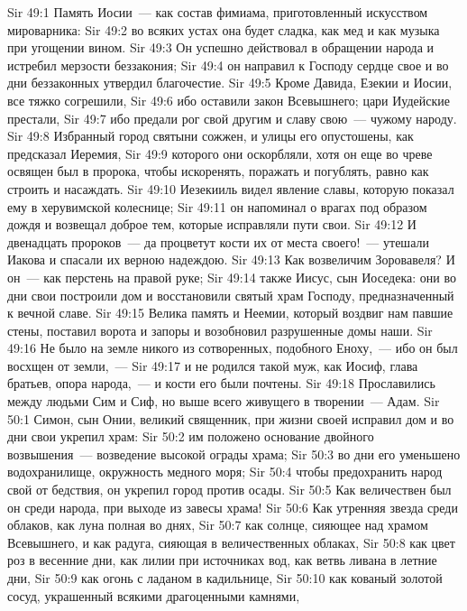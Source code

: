 \vs Sir 49:1 Память Иосии~--- как состав фимиама, приготовленный искусством мироварника:
\vs Sir 49:2 во всяких устах она будет сладка, как мед и как музыка при угощении вином.
\vs Sir 49:3 Он успешно действовал в обращении народа и истребил мерзости беззакония;
\vs Sir 49:4 он направил к Господу сердце свое и во дни беззаконных утвердил благочестие.
\vs Sir 49:5 Кроме Давида, Езекии и Иосии, все тяжко согрешили,
\vs Sir 49:6 ибо оставили закон Всевышнего; цари Иудейские престали,
\vs Sir 49:7 ибо предали рог свой другим и славу свою~--- чужому народу.
\vs Sir 49:8 Избранный город святыни сожжен, и улицы его опустошены, как предсказал Иеремия,
\vs Sir 49:9 которого они оскорбляли, хотя он еще во чреве освящен был в пророка, чтобы искоренять, поражать и погублять, равно как строить и насаждать.
\rsbpar\vs Sir 49:10 Иезекииль видел явление славы, которую  показал ему в херувимской колеснице;
\vs Sir 49:11 он напоминал о врагах под образом дождя и возвещал доброе тем, которые исправляли пути свои.
\vs Sir 49:12 И двенадцать пророков~--- да процветут кости их от места своего!~--- утешали Иакова и спасали их верною надеждою.
\vs Sir 49:13 Как возвеличим Зоровавеля? И он~--- как перстень на правой руке;
\vs Sir 49:14 также Иисус, сын Иоседека: они во дни свои построили дом и восстановили святый храм Господу, предназначенный к вечной славе.
\vs Sir 49:15 Велика память и Неемии, который воздвиг нам павшие стены, поставил ворота и запоры и возобновил разрушенные домы наши.
\vs Sir 49:16 Не было на земле никого из сотворенных, подобного Еноху,~--- ибо он был восхщен от земли,~---
\vs Sir 49:17 и не родился такой муж, как Иосиф, глава братьев, опора народа,~--- и кости его были почтены.
\vs Sir 49:18 Прославились между людьми Сим и Сиф, но выше всего живущего в творении~--- Адам.
\vs Sir 50:1 Симон, сын Онии, великий священник, при жизни своей исправил дом и во дни свои укрепил храм:
\vs Sir 50:2 им положено основание двойного возвышения~--- возведение высокой ограды храма;
\vs Sir 50:3 во дни его уменьшено водохранилище, окружность медного моря;
\vs Sir 50:4 чтобы предохранить народ свой от бедствия, он укрепил город против осады.
\vs Sir 50:5 Как величествен был он среди народа, при выходе из завесы храма!
\vs Sir 50:6 Как утренняя звезда среди облаков, как луна полная во днях,
\vs Sir 50:7 как солнце, сияющее над храмом Всевышнего, и как радуга, сияющая в величественных облаках,
\vs Sir 50:8 как цвет роз в весенние дни, как лилии при источниках вод, как ветвь ливана в летние дни,
\vs Sir 50:9 как огонь с ладаном в кадильнице,
\vs Sir 50:10 как кованый золотой сосуд, украшенный всякими драгоценными камнями,
